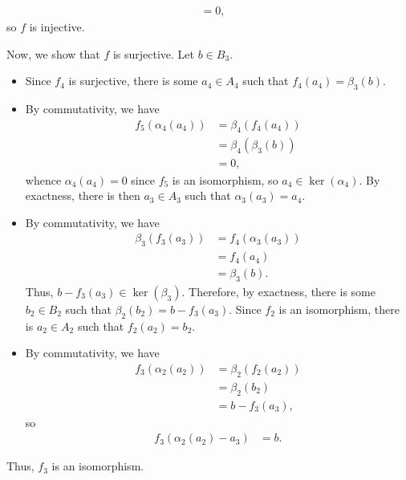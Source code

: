 \documentclass[10pt]{mypackage}
\begin{document}
\begin{solution}
\begin{itemize}
\begin{align*}
          &= 0,
      \end{align*}
      so $f$ is injective.
  \end{itemize}
  Now, we show that $f$ is surjective. Let $b\in B_3$.
  \begin{itemize}
    \item Since $f_4$ is surjective, there is some $a_4\in A_4$ such that $f_4\left( a_4 \right) = \beta_3(b)$.
    \item By commutativity, we have
      \begin{align*}
        f_5\left( \alpha_4\left( a_4 \right) \right) &= \beta_4\left( f_4\left( a_4 \right) \right)\\
                                                     &= \beta_4\left( \beta_3\left( b \right) \right)\\
                                                     &= 0,
      \end{align*}
      whence $\alpha_4\left( a_4 \right) = 0$ since $f_5$ is an isomorphism, so $a_4\in \ker\left( \alpha_4 \right)$. By exactness, there is then $a_3\in A_3$ such that $\alpha_3\left( a_3 \right) = a_4$.
    \item By commutativity, we have
      \begin{align*}
        \beta_3\left( f_3\left( a_3 \right) \right) &= f_4\left( \alpha_3\left( a_3 \right) \right)\\
                                                  &= f_4\left( a_4 \right)\\
                                                  &= \beta_3\left( b \right).
      \end{align*}
      Thus, $b - f_3\left( a_3 \right)\in \ker\left( \beta_3 \right)$. Therefore, by exactness, there is some $b_2\in B_2$ such that $\beta_2\left( b_2 \right) = b-f_3\left( a_3 \right)$. Since $f_2$ is an isomorphism, there is $a_2\in A_2$ such that $f_2\left( a_2 \right) = b_2$.
    \item By commutativity, we have
      \begin{align*}
        f_3\left( \alpha_2\left( a_2 \right) \right) &= \beta_2\left( f_2\left( a_2 \right) \right)\\
                                                     &= \beta_2\left( b_2 \right)\\
                                                     &= b-f_3\left( a_3 \right),
      \end{align*}
      so
      \begin{align*}
        f_3\left( \alpha_2\left( a_2 \right) - a_3 \right) &= b.
      \end{align*}
  \end{itemize}
  Thus, $f_3$ is an isomorphism.
\end{solution}
\end{document}
